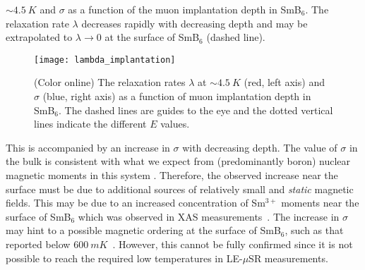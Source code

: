 \documentclass[10pt,aps,prb,twocolumn,showpacs,preprintnumbers,amsmath,amssymb,superscriptaddress,floatfix]{revtex4-1}
\newcommand{\msr}{$\mu$SR}
\newcommand{\lem}{LE-\msr}
\newcommand{\smb}{SmB$_6$}
\newcommand{\usim}{\sim \!}
\begin{document}
$\usim\SI{4.5}{K}$ and $\sigma$ as a function of the muon implantation
depth in \smb{}. The relaxation rate $\lambda$ decreases rapidly with
decreasing depth and may be extrapolated to $\lambda \rightarrow 0$ at
the surface of \smb{} (dashed line).
\begin{figure}[htb]
\texttt{[image: lambda\_implantation]}
\caption{(Color online) The relaxation rates $\lambda$ at
  $\usim\SI{4.5}{K}$ (red, left axis) and $\sigma$ (blue, right axis)
  as a function of muon implantation depth in \smb{}. The dashed lines
  are guides to the eye and the dotted vertical lines indicate the
  different $E$ values.}
 \label{fig:lambda_implantation}
\end{figure}
This is accompanied by an increase in $\sigma$ with decreasing
depth. The value of $\sigma$ in the bulk is consistent with what we
expect from (predominantly boron) nuclear magnetic moments in this
system \cite{Biswas2014prb}. Therefore, the observed increase near the
surface must be due to additional sources of relatively small and
\emph{static} magnetic fields. This may be due to an increased
concentration of Sm$^{3+}$ moments near the surface of \smb{} which
was observed in XAS measurements~\cite{Phelan2014prx}. The increase in
$\sigma$ may hint to a possible magnetic ordering at the surface of
\smb{}, such as that reported below
$\SI{600}{mK}$~\cite{Nakajima2016np,Wolgast2015prb}. However, this
cannot be fully confirmed since it is not possible to reach the
required low temperatures in \lem{} measurements.
\end{document}
